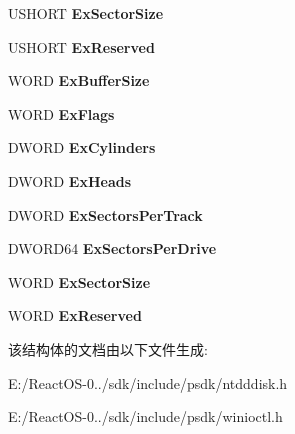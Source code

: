 \begin{DoxyCompactItemize}
U\+S\+H\+O\+RT {\bfseries Ex\+Sector\+Size}
\item 
\mbox{\label{struct___d_i_s_k___e_x___i_n_t13___i_n_f_o_a39fa13886d0f601f26c27bc74dc51488}} 
U\+S\+H\+O\+RT {\bfseries Ex\+Reserved}
\item 
\mbox{\label{struct___d_i_s_k___e_x___i_n_t13___i_n_f_o_a6b3f0b0a82c3c2c57cb4d95646b06b23}} 
W\+O\+RD {\bfseries Ex\+Buffer\+Size}
\item 
\mbox{\label{struct___d_i_s_k___e_x___i_n_t13___i_n_f_o_a2dd914cf5a6e26202d8145b3407eb513}} 
W\+O\+RD {\bfseries Ex\+Flags}
\item 
\mbox{\label{struct___d_i_s_k___e_x___i_n_t13___i_n_f_o_a4bcc9022387c6b8e62399873ce991d35}} 
D\+W\+O\+RD {\bfseries Ex\+Cylinders}
\item 
\mbox{\label{struct___d_i_s_k___e_x___i_n_t13___i_n_f_o_a89ce9863a4f659abefcc59eeb941aee3}} 
D\+W\+O\+RD {\bfseries Ex\+Heads}
\item 
\mbox{\label{struct___d_i_s_k___e_x___i_n_t13___i_n_f_o_ad8c9fff733cbd62b0f30bd383d08dd83}} 
D\+W\+O\+RD {\bfseries Ex\+Sectors\+Per\+Track}
\item 
\mbox{\label{struct___d_i_s_k___e_x___i_n_t13___i_n_f_o_a46b348299d1dc0dd3e102af4dffef1c3}} 
D\+W\+O\+R\+D64 {\bfseries Ex\+Sectors\+Per\+Drive}
\item 
\mbox{\label{struct___d_i_s_k___e_x___i_n_t13___i_n_f_o_a7cbd573887df442a738a3cf000170a0a}} 
W\+O\+RD {\bfseries Ex\+Sector\+Size}
\item 
\mbox{\label{struct___d_i_s_k___e_x___i_n_t13___i_n_f_o_ab61252ab2560d3c405c09d74a01b35f7}} 
W\+O\+RD {\bfseries Ex\+Reserved}
\end{DoxyCompactItemize}


该结构体的文档由以下文件生成\+:\begin{DoxyCompactItemize}
\item 
E\+:/\+React\+O\+S-\/0../sdk/include/psdk/ntdddisk.\+h\item 
E\+:/\+React\+O\+S-\/0../sdk/include/psdk/winioctl.\+h\end{DoxyCompactItemize}
